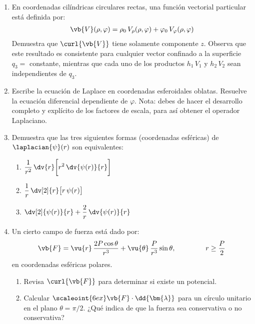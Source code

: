 \begin{enumerate}
\item En coordenadas cilíndricas circulares rectas, una función vectorial particular está definida por:
\begin{align*}
\vb{V} (\rho, \varphi) = \rho_{0} \, V_{\rho} (\rho, \varphi) + \varphi_{0} \, V_{\varphi} (\rho, \varphi)
\end{align*}
Demuestra que $\curl{\vb{V}}$ tiene solamente componente $z$. Observa que este resultado es consistente para cualquier vector confinado a la superficie $q_{3} =$ constante, mientras que cada uno de los productos $h_{1} \, V_{1}$ y $h_{2} \, V_{2}$ sean independientes de $q_{3}$.
\item Escribe la ecuación de Laplace en coordenadas esferoidales oblatas. Resuelve la ecuación diferencial dependiente de $\varphi$. Nota: debes de hacer el desarrollo completo y explícito de los factores de escala, para así obtener el operador Laplaciano.
\item Demuestra que las tres siguientes formas (coordenadas esféricas) de $\laplacian{\psi} (r)$ son equivalentes:
\begin{multicols}{3}
\begin{enumerate}[label=\alph*)]
\item $\displaystyle \dfrac{1}{r^{2}} \, \dv{r} \bigg[ r^{2} \, \dv{\psi (r)}{r} \bigg]$
\item $\displaystyle  \dfrac{1}{r} \, \dv[2]{r} \big[ r \, \psi (r) \big]$
\item $\displaystyle  \dv[2]{\psi (r)}{r} + \dfrac{2}{r} \, \dv{\psi (r)}{r}$
\end{enumerate}
\end{multicols}
\item Un cierto campo de fuerza está dado por:
\begin{align*}
\vb{F} = \vu{r}\, \dfrac{2 P \cos \theta}{r^{3}} + \vu{\theta} \, \dfrac{P}{r^{3}} \sin \theta, \hspace{1.5cm} r \geq \dfrac{P}{2}
\end{align*}
en coordenadas esféricas polares.
\begin{enumerate}[label=\roman*)]
\item Revisa $\curl{\vb{F}}$ para determinar si existe un potencial.
\item Calcular $\scaleoint{6ex} \vb{F} \cdot \dd{\bm{\lambda}}$ para un círculo unitario en el plano $\theta = \pi/2$. ¿Qué indica de que la fuerza sea conservativa o no conservativa?

\end{enumerate}
\end{enumerate}
